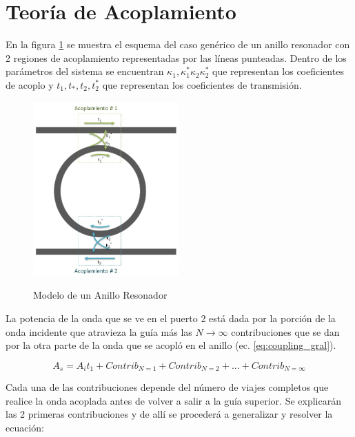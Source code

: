 \section{Teoría de Acoplamiento}
\label{coupling_theory}

En la figura \ref{fig:rr_model} se muestra el esquema del caso genérico de un anillo resonador con 2 regiones de acoplamiento representadas por las líneas punteadas. 
Dentro de los parámetros del sistema se encuentran  
$\kappa_{1},\kappa_{1}^{*}\kappa_{2}\kappa_{2}^{*}$ que representan los coeficientes de acoplo 
y $t_{1}, t_{*}, t_{2}, t_{2}^{*}$ que representan los coeficientes de transmisión.

\begin{figure}[h!]
\caption{Modelo de un Anillo Resonador}
\centering
\includegraphics[width=0.5\textwidth,natwidth=559,natheight=668]{figs/rr_model.jpg}
\label{fig:rr_model}
\end{figure} 

La potencia de la onda que se ve en el puerto 2 está dada por la porción de la onda incidente
que atravieza la guía más las $N\to\infty$ contribuciones que se dan por la otra parte de la
onda que se acopló en el anillo (ec. \ref{eq:coupling_gral}).

\begin{equation}
A_s = A_i t_1 + Contrib_{N=1} + Contrib_{N=2} + ... + Contrib_{N=\infty}
\label{eq:coupling_gral}
\end{equation} 

Cada una de las contribuciones depende del número de viajes completos que realice la onda
acoplada antes de volver a salir a la guía superior.
Se explicarán las 2 primeras contribuciones y de allí se procederá a 
generalizar y resolver la ecuación:

